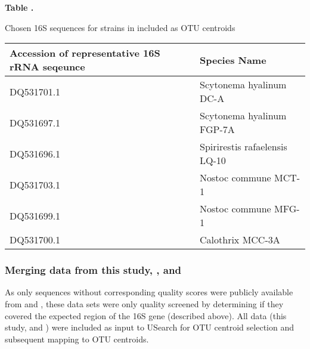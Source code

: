 \begin{table}

\textbf{
\label{table:yeager_2006} 
Table .
}

{Chosen 16S sequences for strains in \citet{Yeager} included as
OTU centroids}

{\begin{tabular}{ l l }
\toprule
\textbf{Accession of representative 16S rRNA seqeunce} & \textbf{Species Name} \\ \midrule 
DQ531701.1 & Scytonema hyalinum DC-A \\ \midrule 
DQ531697.1 & Scytonema hyalinum FGP-7A \\ \midrule
DQ531696.1 & Spirirestis rafaelensis LQ-10 \\ \midrule
DQ531703.1 & Nostoc commune MCT-1 \\ \midrule
DQ531699.1 & Nostoc commune MFG-1 \\ DQ531700.1 & Calothrix MCC-3A  \\ 
\bottomrule
\end{tabular}}{} 

\end{table}


\subsubsection{Merging data from this study, \citet{Garcia_Pichel_2013}, and
\citet{Steven_2013}} As only sequences without corresponding quality scores
were publicly available from \citet{Garcia_Pichel_2013} and
\citet{Steven_2013}, these data sets were only quality screened by determining
if they covered the expected region of the 16S gene (described above). All data
(this study, \citet{Garcia_Pichel_2013} and \citet{Steven_2013}) were included
as input to USearch for OTU centroid selection and subsequent mapping to OTU
centroids. 

